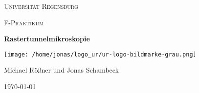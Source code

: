 \begin{titlepage}
	\centering
	{\scshape \LARGE Universität Regensburg \par}
	\vspace{1cm}
	{\scshape\Large F-Praktikum\par}
	\vspace{1.5cm}
	{\huge\bfseries Rastertunnelmikroskopie\par}
	\vspace{2cm}
	\texttt{[image: /home/jonas/logo\_ur/ur-logo-bildmarke-grau.png]}\par
	\vfill
	{\large Michael Rößner und Jonas Schambeck\par}

	\vfill

	{\large \today\par}
\end{titlepage}
